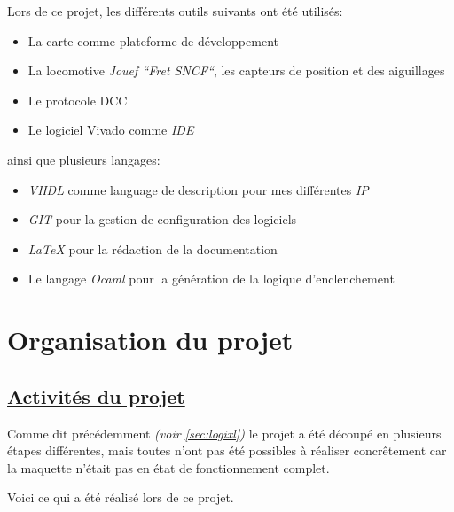 Lors de ce projet, les diff\'erents outils suivants ont été utilisés:
\medskip
\begin{itemize}
  \item La carte \crt comme plateforme de d\'eveloppement
  \item La locomotive \emph{Jouef ``Fret SNCF``}\cite{Jouef}, les capteurs de
    position et des aiguillages
  \item Le protocole DCC \cite{DCC}
  \item Le logiciel Vivado comme \emph{IDE}
\end{itemize}
\medskip
ainsi que plusieurs langages:
\begin{itemize}
  \item \emph{VHDL}\cite{VHDL} comme language de description pour mes diff\'erentes
    \emph{IP}
  \item \emph{GIT}\cite{GIT} pour la gestion de configuration des logiciels
  \item \emph{\LaTeX}\cite{LATEX} pour la r\'edaction de la documentation
  \item Le langage \emph{Ocaml}\cite{OCAML} pour la g\'en\'eration de la logique d'enclenchement
\end{itemize}

\newpage
\section{Organisation du projet}
\label{sec:org_proj}

\subsection{\underline{Activit\'es du projet}}
\label{sec:activ}

Comme dit précédemment \emph{(voir \ref{sec:logixl})} le projet a \'et\'e
découp\'e en plusieurs \'etapes diff\'erentes, mais toutes n'ont pas été
possibles à réaliser concrêtement car la maquette n'\'etait pas en \'etat de
fonctionnement complet.


Voici ce qui a \'et\'e r\'ealis\'e lors de ce projet.

